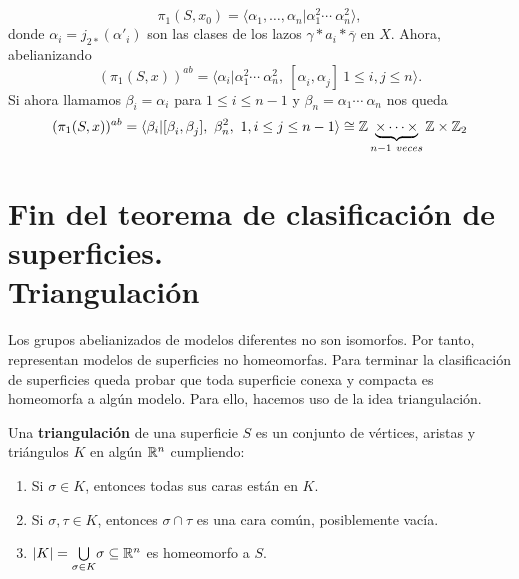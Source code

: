 \documentclass[GTS.tex]{subfiles}
\begin{document}
\[
\pi_1(S,x_0)=\langle\alpha_1,\dots,\alpha_n|\alpha_1^2\cdots\ \alpha_n^2\rangle,
\]
donde $\alpha_i=j_{2*}(\alpha'_i)$ son las clases de los lazos $\gamma*a_i*\overline{\gamma}$ en $X$. Ahora, abelianizando
\[
(\pi_1(S,x))^{ab}=\langle\alpha_i|\alpha_1^2\cdots\ \alpha_n^2,\ [\alpha^{}_i,\alpha^{}_j]\ 1\leq i, j\leq n \rangle.
\]
Si ahora llamamos $\beta_i=\alpha_i$ para $1\leq i\leq n-1$ y $\beta_n=\alpha_1\cdots\ \alpha_n$ nos queda
\[
(\pi_1(S,x))^{ab}=\langle\beta_i|[\beta^{}_i,\beta^{}_j],\ \beta^2_n,\ 1, i\leq j\leq n-1\rangle\cong\Z\underbrace{\times\cdots\times}_{n-1\ veces}\Z\times\Z_2
\]
\section{Fin del teorema de clasificación de superficies.\\ Triangulación}
Los grupos abelianizados de modelos diferentes no son isomorfos. Por tanto, representan modelos de superficies no homeomorfas. Para terminar la clasificación de superficies queda probar que toda superficie conexa y compacta es homeomorfa a algún modelo. Para ello, hacemos uso de la idea triangulación.

\begin{defi}
Una \textbf{triangulación} de una superficie $S$ es un conjunto de vértices, aristas y triángulos $K$  en algún $\mathbb{R}^n$ cumpliendo:
\begin{enumerate}
\item Si $\sigma\in K$, entonces todas sus caras están en $K$.
\item Si $\sigma,\tau\in K$, entonces $\sigma\cap\tau$ es una cara común, posiblemente vacía.
\item $|K|=\underset{\sigma\in K}{\bigcup}\sigma\subseteq\mathbb{R}^n$ es homeomorfo a $S$.
\end{enumerate}
\end{defi}
\end{document}
